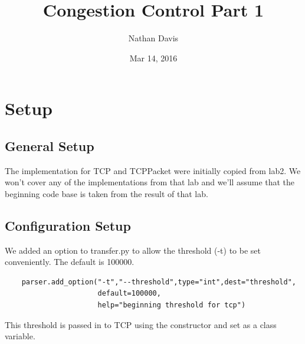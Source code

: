 \documentclass[11pt]{article}
\begin{document}
\lstset{
  language=Python,
  basicstyle=\small,          %
  keywordstyle=\bfseries,
  identifierstyle=,           %
  commentstyle=,              %
  stringstyle=\ttfamily,      %
  showstringspaces=false,     %
  numbers=left,
  numberstyle=\tiny,
  numbersep=5pt,
  frame=tb,
}

\title{Congestion Control Part 1}

\author{Nathan Davis}

\date{Mar 14, 2016}

\maketitle

\section{Setup}

\subsection{General Setup}

The implementation for TCP and TCPPacket were initially copied from lab2. We won't cover any of the implementations from that lab and we'll assume that the beginning code base is taken from the result of that lab.

\subsection{Configuration Setup}

We added an option to transfer.py to allow the threshold (-t) to be set conveniently. The default is 100000.

\vspace{5mm}

\begin{lstlisting}
    parser.add_option("-t","--threshold",type="int",dest="threshold",
                      default=100000,
                      help="beginning threshold for tcp")
\end{lstlisting}

\vspace{5mm}

This threshold is passed in to TCP using the constructor and set as a class variable.

\vspace{5mm}
\end{document}
